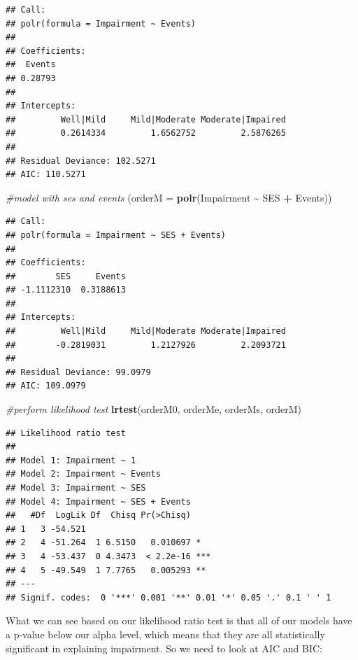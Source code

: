 \documentclass[
]{article}
\newenvironment{Shaded}{\begin{snugshade}}{\end{snugshade}}
\newcommand{\AttributeTok}[1]{\textcolor[rgb]{0.13,0.29,0.53}{#1}}
\newcommand{\CommentTok}[1]{\textcolor[rgb]{0.56,0.35,0.01}{\textit{#1}}}
\newcommand{\FunctionTok}[1]{\textcolor[rgb]{0.13,0.29,0.53}{\textbf{#1}}}
\newcommand{\NormalTok}[1]{#1}
\newcommand{\SpecialCharTok}[1]{\textcolor[rgb]{0.81,0.36,0.00}{\textbf{#1}}}
\begin{document}
\begin{verbatim}
## Call:
## polr(formula = Impairment ~ Events)
## 
## Coefficients:
##  Events 
## 0.28793 
## 
## Intercepts:
##         Well|Mild     Mild|Moderate Moderate|Impaired 
##         0.2614334         1.6562752         2.5876265 
## 
## Residual Deviance: 102.5271 
## AIC: 110.5271
\end{verbatim}

\begin{Shaded}
\begin{Highlighting}[]
\CommentTok{\#model with ses and events}
\NormalTok{(}\AttributeTok{orderM =} \FunctionTok{polr}\NormalTok{(Impairment }\SpecialCharTok{\textasciitilde{}}\NormalTok{ SES }\SpecialCharTok{+}\NormalTok{ Events))}
\end{Highlighting}
\end{Shaded}

\begin{verbatim}
## Call:
## polr(formula = Impairment ~ SES + Events)
## 
## Coefficients:
##        SES     Events 
## -1.1112310  0.3188613 
## 
## Intercepts:
##         Well|Mild     Mild|Moderate Moderate|Impaired 
##        -0.2819031         1.2127926         2.2093721 
## 
## Residual Deviance: 99.0979 
## AIC: 109.0979
\end{verbatim}

\begin{Shaded}
\begin{Highlighting}[]
\CommentTok{\#perform likelihood test}
\FunctionTok{lrtest}\NormalTok{(orderM0, orderMe, orderMs, orderM)}
\end{Highlighting}
\end{Shaded}

\begin{verbatim}
## Likelihood ratio test
## 
## Model 1: Impairment ~ 1
## Model 2: Impairment ~ Events
## Model 3: Impairment ~ SES
## Model 4: Impairment ~ SES + Events
##   #Df  LogLik Df  Chisq Pr(>Chisq)    
## 1   3 -54.521                         
## 2   4 -51.264  1 6.5150   0.010697 *  
## 3   4 -53.437  0 4.3473  < 2.2e-16 ***
## 4   5 -49.549  1 7.7765   0.005293 ** 
## ---
## Signif. codes:  0 '***' 0.001 '**' 0.01 '*' 0.05 '.' 0.1 ' ' 1
\end{verbatim}

What we can see based on our likelihood ratio test is that all of our
models have a p-value below our alpha level, which means that they are
all statistically significant in explaining impairment. So we need to
look at AIC and BIC:
\end{document}
